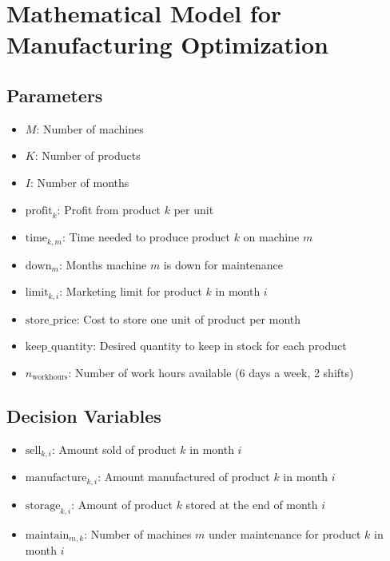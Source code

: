 \documentclass{article}
\begin{document}
\section*{Mathematical Model for Manufacturing Optimization}

\subsection*{Parameters}
\begin{itemize}
    \item \( M \): Number of machines
    \item \( K \): Number of products
    \item \( I \): Number of months
    \item \( \text{profit}_k \): Profit from product \( k \) per unit
    \item \( \text{time}_{k,m} \): Time needed to produce product \( k \) on machine \( m \)
    \item \( \text{down}_m \): Months machine \( m \) is down for maintenance
    \item \( \text{limit}_{k,i} \): Marketing limit for product \( k \) in month \( i \)
    \item \( \text{store\_price} \): Cost to store one unit of product per month
    \item \( \text{keep\_quantity} \): Desired quantity to keep in stock for each product
    \item \( n_{\text{workhours}} \): Number of work hours available (6 days a week, 2 shifts)
\end{itemize}

\subsection*{Decision Variables}
\begin{itemize}
    \item \( \text{sell}_{k,i} \): Amount sold of product \( k \) in month \( i \)
    \item \( \text{manufacture}_{k,i} \): Amount manufactured of product \( k \) in month \( i \)
    \item \( \text{storage}_{k,i} \): Amount of product \( k \) stored at the end of month \( i \)
    \item \( \text{maintain}_{m,k} \): Number of machines \( m \) under maintenance for product \( k \) in month \( i \)
\end{itemize}
\end{document}
